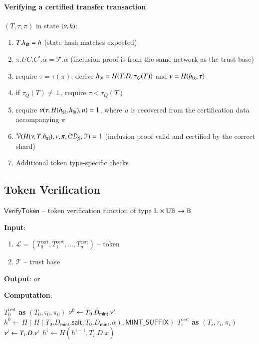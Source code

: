 \paragraph{Verifying a certified transfer transaction} $(T, \tau, \pi)$ in state $(\nu, h)$:
\begin{enumerate}
	\item $T.{h_\mathsf{st}} = h$ \quad (state hash matches expected)
	\item $\pi.UC.C^\mathsf{r}.\alpha = \mathcal{T}.\alpha$ \quad (inclusion proof is from the same network as the trust base)
	\item require $\tau=\tau(\pi)$; derive ${h_\mathsf{tx}}=H(T.D,\tau_Q(T))$ and $v=H({h_\mathsf{tx}},\tau)$
	\item if $\tau_Q(T)\ne\bot$, require $\tau < \tau_Q(T)$
	\item require $\nu(\tau, H({h_\mathsf{st}}, {h_\mathsf{tx}}), u) = 1$, where $u$ is recovered from the certification data accompanying $\pi$
	\item $\mathcal{V}(H(\nu, T.{h_\mathsf{st}}), v, \pi, \mathcal{CD}_\beta, \mathcal{T}) = 1$ \quad (inclusion proof valid and certified by the correct shard)
	\item Additional token type-specific checks
\end{enumerate}

\subsection{Token Verification}\label{sec:token-verification}

$\mathsf{VerifyToken}$ -- token verification function of type $\mathbb{L} \times \mathbb{UB} \to \mathbb{B}$

\textbf{Input}:
\begin{enumerate}
	\item $\mathcal{L} = (T_0^\mathsf{cert}, T_1^\mathsf{cert}, \ldots, T_n^\mathsf{cert})$ -- token
	\item $\mathcal{T}$ -- trust base
\end{enumerate}

\textbf{Output}: \TRUE or \FALSE

\textbf{Computation}:
\begin{algorithmic}[0]
	\State \Parse $T_0^\mathsf{cert}$ \textbf{as} $(T_0, \tau_0, \pi_0)$
	 \Return \FALSE \EndIf
	 \Return \FALSE \EndIf
	\State $\nu^0 \gets T_0.D_\mathsf{mint}.\nu'$
	\State $h^0 \gets H(H(T_0.D_\mathsf{mint}.\mathsf{salt}, T_0.D_\mathsf{mint}.\alpha), \mathsf{MINT\_SUFFIX})$
		\State \Parse $T_i^\mathsf{cert}$ \textbf{as} $(T_i, \tau_i, \pi_i)$
		 \Return \FALSE \EndIf
		\State $\nu^{i} \gets T_i.D.\nu'$
		\State $h^{i} \gets H(h^{i-1}, T_i.D.x)$
	\EndFor
	\State \Return \TRUE
\end{algorithmic}

